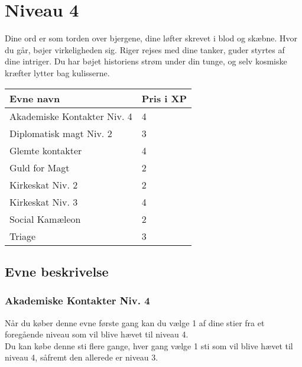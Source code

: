 \chapter*{Niveau 4}

Dine ord er som torden over bjergene, dine løfter skrevet i blod og skæbne. Hvor du går, bøjer virkeligheden sig. Riger rejses med dine tanker, guder styrtes af dine intriger. Du har bøjet historiens strøm under din tunge, og selv kosmiske kræfter lytter bag kulisserne.

\begin{table}[H]
    \centering
    \begin{tabular}{|p{}|p{}|}
    \rowcolor{cerulean!80}\hline
        Evne navn & Pris i XP \\\hline
         Akademiske Kontakter Niv. 4 &4 \\\hline
         Diplomatisk magt Niv. 2 & 3 \\\hline
         Glemte kontakter & 4 \\\hline
         Guld for Magt & 2 \\\hline
         Kirkeskat Niv. 2 & 2 \\\hline
         Kirkeskat Niv. 3 & 4 \\\hline
         Social Kamæleon & 2 \\\hline
         Triage & 3 \\\hline
    \end{tabular}
\end{table}
\section*{Evne beskrivelse}

\subsection*{Akademiske Kontakter Niv. 4}

Når du køber denne evne første gang kan du vælge 1 af dine stier fra et foregående niveau som vil blive hævet til niveau 4.\\
Du kan købe denne sti flere gange, hver gang vælge 1 sti som vil blive hævet til niveau 4, såfremt den allerede er niveau 3. \\

